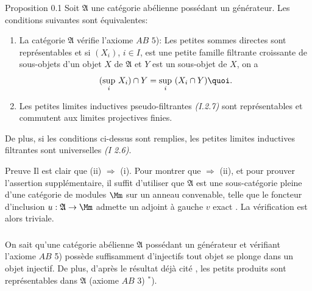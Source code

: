 \begin{enonce*}{Proposition 0.1}
Soit $\mathfrak{A}$ une catégorie abélienne possédant un
générateur. Les conditions suivantes sont équivalentes:
\begin{enumerate}
\renewcommand{\theenumi}{\roman{enumi}}
\renewcommand{\labelenumi}{\theenumi)}
\item La catégorie $\mathfrak{A}$ vérifie l'axiome $AB$ $5$): Les
  petites sommes directes sont représentables et si $(X_i)$, $i \in
  I$, est une petite famille filtrante croissante de sous-objets d'un
  objet $X$ de $\mathfrak{A}$ et $Y$ est un sous-objet de $X$, on a
$$
(\displaystyle{\sup_i}\ X_i) \cap Y = \displaystyle{\sup_i}\ (X_i \cap Y) {\quoi}.
$$
\item Les petites limites inductives pseudo-filtrantes \emph{(I.2.7)} %
sont représentables et commutent aux limites projectives finies.
\end{enumerate}

De plus, si les conditions ci-dessus sont remplies, les petites
limites inductives filtrantes sont universelles \emph{(I 2.6)}.
\end{enonce*}

\begin{enonce*}[remark]{Preuve}
Il est clair que (ii) $\Rightarrow$ (i). Pour montrer que
 $\Rightarrow$ (ii), et pour prouver l'assertion
supplémentaire, il suffit d'utiliser que $\mathfrak{A}$ est une
sous-catégorie pleine d'une catégorie de modules $\Mm$
sur un anneau convenable, telle que le foncteur d'inclusion $u :
\mathfrak{A} \rightarrow \Mm$ admette un adjoint à gauche
$v$ exact \cite{5}. La vérification est alors triviale.
\end{enonce*}

\setcounter{subsection}{1}
\subsubsection{}

On sait \cite{11} qu'une catégorie abélienne $\mathfrak{A}$
possédant un générateur et vérifiant l'axiome $AB$ 5) possède
suffisamment d'injectifs \ie tout objet se plonge dans un objet
injectif. De plus, d'après le résultat déjà cité \cite{5}, les
petits produits sont représentables dans $\mathfrak{A}$ (axiome $AB$
3) $^{\ast}$).

